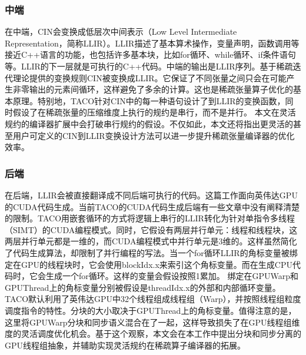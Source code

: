\subsubsection{中端}
在中端，CIN会变换成低层次中间表示（Low Level Intermediate Representation，简称LLIR）。LLIR描述了基本算术操作，变量声明，函数调用等接近C++语言的功能，也包括许多基本块，比如for循环、while循环、if条件语句等。LLIR的下一层就是可执行的C++代码。中端的输出是LLIR序列。基于稀疏迭代理论\cite{kjolstad:2020:phd-thesis}提供的变换规则CIN被变换成LLIR。它保证了不同张量之间只会在可能产生非零输出的元素间循环，这样避免了多余的计算。这也是稀疏张量算子优化的基本原理。特别地，TACO针对CIN中的每一种语句设计了到LLIR的变换函数，同时假设了在稀疏张量的压缩维度上执行的规约是串行，而不是并行。
本文在灵活规约的编译器扩展中会打破串行规约的假设。不仅如此，本文还将指出更灵活的甚至用户可定义的CIN到LLIR变换设计方法可以进一步提升稀疏张量编译器的优化效率。
\subsubsection{后端}
在后端，LLIR会被直接翻译成不同后端可执行的代码。这篇工作面向英伟达GPU的CUDA代码生成。当前TACO的CUDA代码生成后端有一些文章中没有阐释清楚的限制。TACO用嵌套循环的方式\cite{senanayake:2020:scheduling}将逻辑上串行的LLIR转化为针对单指令多线程（SIMT）的CUDA编程模式。同时，它假设有两层并行单元：线程和线程块，这两层并行单元都是一维的，而CUDA编程模式中并行单元是3维的。这样虽然简化了代码生成算法，却限制了并行编程的写法。当一个for循环LLIR的角标变量被绑定在GPU的线程块时，它会使用blockIdx.x来索引这个角标变量。而在生成CPU代码时，它会生成一个for循环。这样的变量会假设按照1累加。
绑定在GPUWarp和GPUThread上的角标变量分别被假设是threadIdx.x的外部和内部循环变量。TACO默认利用了英伟达GPU中32个线程组成线程组（Warp），并按照线程组粒度调度指令的特性。分块的大小取决于GPUThread上的角标变量。值得注意的是，这里将GPUWarp分块和同步语义混合在了一起，这样导致损失了在GPU线程组维度的灵活调度优化机会。基于这个观察，本文会在本工作中提出分块和同步分离的GPU线程组抽象，并辅助实现灵活规约在稀疏算子编译器的拓展。
